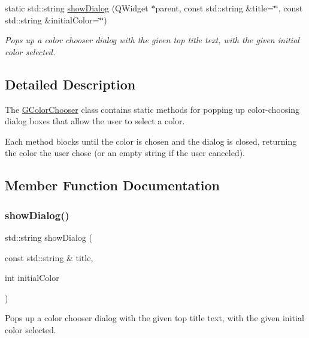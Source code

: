 \begin{DoxyCompactItemize}
static std\+::string \mbox{\hyperlink{classsgl_1_1GColorChooser_ab17d15e0eeebb06c853c197a63949d13}{show\+Dialog}} (Q\+Widget $\ast$parent, const std\+::string \&title=\char`\"{}\char`\"{}, const std\+::string \&initial\+Color=\char`\"{}\char`\"{})
\begin{DoxyCompactList}\small\item\em Pops up a color chooser dialog with the given top title text, with the given initial color selected. \end{DoxyCompactList}\end{DoxyCompactItemize}


\subsection{Detailed Description}
The \mbox{\hyperlink{classsgl_1_1GColorChooser}{G\+Color\+Chooser}} class contains static methods for popping up color-\/choosing dialog boxes that allow the user to select a color. 

Each method blocks until the color is chosen and the dialog is closed, returning the color the user chose (or an empty string if the user canceled). 

\subsection{Member Function Documentation}
\mbox{\label{classsgl_1_1GColorChooser_a606489cbaca9144ee0a8e22d7646182a}} 
\subsubsection{\texorpdfstring{show\+Dialog()}{showDialog()}\hspace{0.1cm}{\footnotesize\ttfamily [1/6]}}
{\footnotesize\ttfamily std\+::string show\+Dialog (\begin{DoxyParamCaption}\item[{const std\+::string \&}]{title,  }\item[{int}]{initial\+Color }\end{DoxyParamCaption})\hspace{0.3cm}{\ttfamily [static]}}



Pops up a color chooser dialog with the given top title text, with the given initial color selected. 

